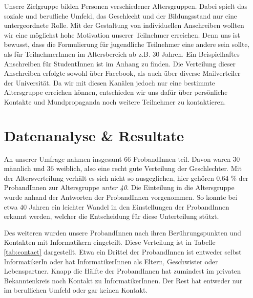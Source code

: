 \documentclass[de]{agse-empir-report}\usepackage[]{graphicx}\usepackage[]{color}
\begin{document}
Unsere Zielgruppe bilden Personen verschiedener Altersgruppen. Dabei spielt das soziale und berufliche Umfeld, das Geschlecht und der Bildungsstand nur eine untergeordnete Rolle. Mit der Gestaltung von individuellen Anschreiben wollten wir eine möglichst hohe Motivation unserer Teilnehmer erreichen. Denn uns ist bewusst, dass die Formulierung für jugendliche Teilnehmer eine andere sein sollte, als für TeilnehmerInnen im Altersbereich ab z.B. 30 Jahren. Ein Beispielhaftes Anschreiben für StudentInnen ist im Anhang zu finden. Die Verteilung dieser Anschreiben erfolgte sowohl über Facebook, als auch über diverse Mailverteiler der Universität. Da wir mit diesen Kanälen jedoch nur eine bestimmte Altersgruppe erreichen können, entschieden wir uns dafür über persönliche Kontakte und Mundpropaganda noch weitere Teilnehmer zu kontaktieren.

\section[sl]{Datenanalyse \& Resultate} \label{sec:analyse}




An unserer Umfrage nahmen insgesamt 66 ProbandInnen teil. Davon waren 30 m\"annlich und 36 weiblich, also eine recht gute Verteilung der Geschlechter. Mit der Altersverteilung verh\"alt es sich nicht so ausgeglichen, hier gehören 0.64 \% der ProbandInnen zur Altersgruppe \emph{unter 40}. Die Einteilung in die Altersgruppe wurde anhand der Antworten der ProbandInnen vorgenommen. So konnte bei etwa 40 Jahren ein leichter Wandel in den Einstellungen der ProbandInnen erkannt werden, welcher die Entscheidung f\"ur diese Unterteilung st\"utzt.

Des weiteren wurden unsere ProbandInnen nach ihren Ber\"uhrungspunkten und Kontakten mit Informatikern eingeteilt. Diese Verteilung ist in Tabelle \ref{tab:contact} dargestellt. Etwa ein Drittel der ProbandInnen ist entweder selbst InformatikerIn oder hat InformatikerInnen als Eltern, Geschwister oder Lebenspartner. Knapp die H\"alfte der ProbandInnen hat zumindest im privaten Bekanntenkreis noch Kontakt zu InformatikerInnen. Der Rest hat entweder nur im beruflichen Umfeld oder gar keinen Kontakt.
\end{document}
